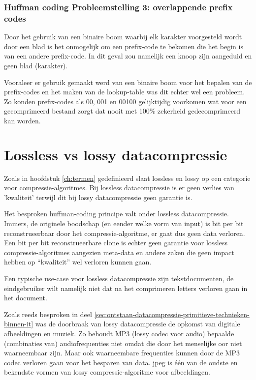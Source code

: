 \subsubsection{Huffman coding Probleemstelling 3: overlappende prefix codes}
\label{sec:primitieve-technieken-voorbeeld-huffman-probleem-3}
\label{sec:primitieve-technieken-voorbeeld-huffman-probleem-2}
Door het gebruik van een binaire boom waarbij elk karakter voorgesteld wordt door een blad is het onmogelijk om een \gls{prefix-code} te bekomen die het begin is van een andere \gls{prefix-code}. In dit geval zou namelijk een knoop zijn aangeduid en geen blad (karakter).

Vooraleer er gebruik gemaakt werd van een binaire boom voor het bepalen van de \glspl{prefix-code} en het maken van de \gls{lookup-table} was dit echter wel een probleem. Zo konden \glspl{prefix-code} als 00, 001 en 00100 gelijktijdig voorkomen wat voor een gecomprimeerd bestand zorgt dat nooit met 100\% zekerheid gedecomprimeerd kan worden.

\section{Lossless vs lossy datacompressie}
\label{sec:ontstaan-datacompressie-lossless-lossy}
Zoals in hoofdstuk \ref{ch:termen} gedefinieerd slaat \gls{lossless} en \gls{lossy} op een categorie voor \glspl{compressie-algoritme}.
Bij \gls{lossless} \gls{datacompressie} is er geen verlies van 'kwaliteit' terwijl dit bij \gls{lossy} \gls{datacompressie} geen garantie is.

Het besproken \gls{huffman-coding} principe valt onder \gls{lossless} \gls{datacompressie}. Immers, de originele boodschap (en eender welke vorm van input) is bit per bit reconstrueerbaar door het \gls{compressie-algoritme}, er gaat dus geen data verloren. Een bit per bit reconstrueerbare clone is echter geen garantie voor \gls{lossless} \glspl{compressie-algoritme} aangezien \gls{meta-data} en andere zaken die geen impact hebben op “kwaliteit” wel verloren kunnen gaan.

Een typische \gls{use-case} voor \gls{lossless} \gls{datacompressie} zijn tekstdocumenten, de eindgebruiker wilt namelijk niet dat na het comprimeren letters verloren gaan in het document. 

Zoals reeds besproken in deel \ref{sec:ontstaan-datacompressie-primitieve-technieken-binnen-it} was de doorbraak van \gls{lossy} \gls{datacompressie} de opkomst van digitale afbeeldingen en muziek. Zo behoudt MP3 (\gls{lossy} \gls{codec} voor audio) bepaalde (combinaties van) audiofrequenties niet omdat die door het menselijke oor niet waarneembaar zijn. Maar ook waarneembare frequenties kunnen door de MP3 \gls{codec} verloren gaan voor het besparen van data. \gls{jpeg} is één van de oudste en bekendste vormen van \gls{lossy} \gls{compressie-algoritme} voor afbeeldingen. 

